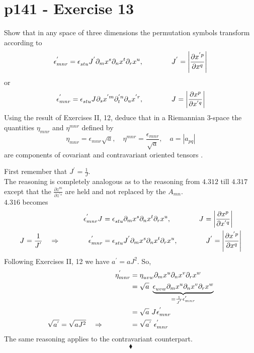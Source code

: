 \section{p141 - Exercise 13}
\begin{tcolorbox}
Show that in any space of three dimensions the permutation symbols transform according to
$$\epsilon^{'}_{mnr}= \epsilon^{}_{stu}J^{'}\partial_m x^s\partial_n x^t\partial_r x^u, \quad\quad\quad\quad J^{'}= \left|\frac{\partial x^{'p}}{\partial x^{q}}\right|$$
or
$$\epsilon^{'}_{mnr}= \epsilon^{}_{stu}J^{}\partial_s x^{'m}\partial_t ^{'n}\partial_u x^{'r}, \quad\quad\quad\quad J^{}= \left|\frac{\partial x^{p}}{\partial x^{'q}}\right|$$
Using the result of Exercises II, 12, deduce that in a Riemannian 3-space the quantities $\eta_{mnr}$ and $\eta^{mnr}$ defined by 
$$ \eta_{mnr}= \epsilon^{}_{mnr}\sqrt{a}, \quad \eta^{mnr}= \frac{\epsilon^{}_{mnr}}{\sqrt{a}}, \quad a=\left|a_{pq}\right|$$
are components of covariant and contravariant oriented tensors .
\end{tcolorbox}
First remember that $J^{'}= \frac{1}{J}$.\\
The reasoning is completely analogous as to the reasoning from $\mathbf{4.312}$ till $\mathbf{4.317}$ except that the $\frac{\partial z^{m}}{\partial z^{'s}}$ are held and not replaced by the $A_{mn}$.\\
$\mathbf{4.316}$ becomes
\begin{align*}
\epsilon^{'}_{mnr}J^{}&= \epsilon^{}_{stu}\partial_m x^s\partial_n x^t\partial_r x^u, \quad\quad\quad\quad J^{}= \left|\frac{\partial x^{p}}{\partial x^{'q}}\right|\\
J^{}= \frac{1}{J^{'}}\quad \Rightarrow\quad\quad\quad\quad\epsilon^{'}_{mnr}&= \epsilon^{}_{stu}J^{'}\partial_m x^s\partial_n x^t\partial_r x^u, \quad\quad\quad\quad J^{'}= \left|\frac{\partial x^{'p}}{\partial x^{q}}\right|
\end{align*}
Following Exercises II, 12  we have $a^{'} = aJ^2$. So,
\begin{align*}
\eta^{'}_{mnr} &=\eta^{}_{uvw} \partial_m x^u\partial_n x^v\partial_r x^w\\
&=\sqrt{a}\ \underbrace{\epsilon^{}_{uvw}\partial_m x^u\partial_n x^v\partial_r x^w}_{= \frac{1}{J^{'}}\epsilon^{'}_{mnr}}\\
&=\sqrt{a}\ J^{}\epsilon^{'}_{mnr}\\
\sqrt{a^{'}} = \sqrt{aJ^2}\quad\Rightarrow\spatie&= \sqrt{a^{'}}\ \epsilon^{'}_{mnr}
\end{align*}
The same reasoning applies to the contravariant counterpart.
$$\blacklozenge$$
\newpage


